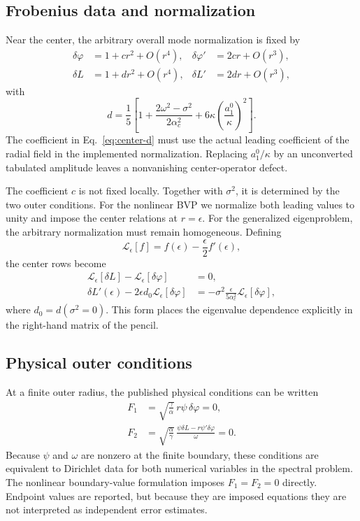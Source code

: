 \documentclass[aps,prd,preprint,onecolumn,nofootinbib,superscriptaddress,showkeys]{revtex4-2}
\newcommand{\sigmatwo}{\sigma^{2}}
\begin{document}
\subsection{Frobenius data and normalization}

Near the center, the arbitrary overall mode normalization is fixed by
\begin{align}
\delta\varphi&=1+cr^{2}+O(r^{4}), & \delta\varphi'&=2cr+O(r^{3}),\\
\delta L&=1+dr^{2}+O(r^{4}), & \delta L'&=2dr+O(r^{3}),
\end{align}
with
\begin{equation}
d=\frac{1}{5}\left[1+\frac{2\omega^{2}-\sigmatwo}{2\alpha_{c}^{2}}
+6\kappa\left(\frac{a_{1}^{0}}{\kappa}\right)^{2}\right].
\label{eq:center-d}
\end{equation}
The coefficient in Eq.~\eqref{eq:center-d} must use the actual leading coefficient of the radial field in the implemented normalization. Replacing $a_{1}^{0}/\kappa$ by an unconverted tabulated amplitude leaves a nonvanishing center-operator defect.

The coefficient $c$ is not fixed locally. Together with $\sigmatwo$, it is determined by the two outer conditions. For the nonlinear BVP we normalize both leading values to unity and impose the center relations at $r=\epsilon$. For the generalized eigenproblem, the arbitrary normalization must remain homogeneous. Defining
\begin{equation}
\mathcal{L}_{\epsilon}[f]
=f(\epsilon)-\frac{\epsilon}{2}f'(\epsilon),
\label{eq:leading-functional}
\end{equation}
the center rows become
\begin{align}
\mathcal{L}_{\epsilon}[\delta L]
-\mathcal{L}_{\epsilon}[\delta\varphi]&=0,
\label{eq:center-row-one}\\
\delta L'(\epsilon)-2\epsilon d_{0}
\mathcal{L}_{\epsilon}[\delta\varphi]
&=-\sigmatwo\frac{\epsilon}{5\alpha_{c}^{2}}
\mathcal{L}_{\epsilon}[\delta\varphi],
\label{eq:center-row-two}
\end{align}
where $d_{0}=d(\sigmatwo=0)$. This form places the eigenvalue dependence explicitly in the right-hand matrix of the pencil.

\subsection{Physical outer conditions}

At a finite outer radius, the published physical conditions can be written
\begin{align}
F_{1}&=\sqrt{\frac{\gamma}{\alpha}}\,r\psi\,\delta\varphi=0,\\
F_{2}&=\sqrt{\frac{\alpha}{\gamma}}\,
\frac{\psi\delta L-r\psi'\delta\varphi}{\omega}=0.
\end{align}
Because $\psi$ and $\omega$ are nonzero at the finite boundary, these conditions are equivalent to Dirichlet data for both numerical variables in the spectral problem. The nonlinear boundary-value formulation imposes $F_{1}=F_{2}=0$ directly. Endpoint values are reported, but because they are imposed equations they are not interpreted as independent error estimates.
\end{document}
